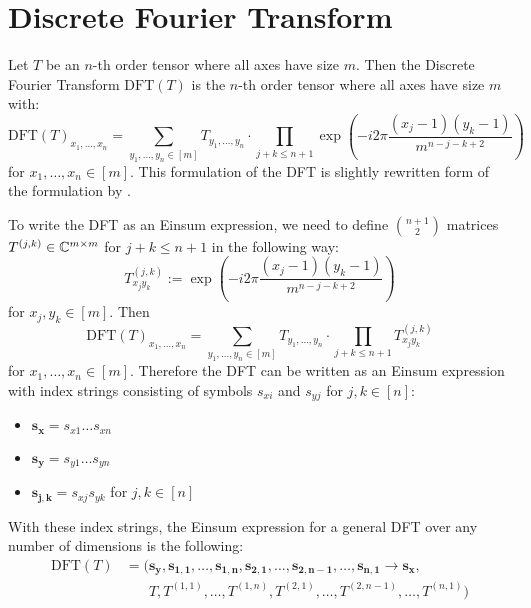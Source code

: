 \section{Discrete Fourier Transform}
Let $T$ be an $n$-th order tensor where all axes have size $m$.
Then the Discrete Fourier Transform $\text{DFT}(T)$ is the $n$-th order tensor where all axes have size $m$ with:
$$\text{DFT}(T)_{x_1,\dots,x_n} = \sum\limits_{y_1,\dots,y_n \in [m]} T_{y_1, \dots, y_n} \cdot \prod\limits_{j + k \leq n + 1} \exp\left(-i2\pi \frac{(x_j - 1) (y_k - 1)}{m^{n - j - k + 2}}\right)$$
for $x_1,\dots,x_n \in [m]$.
This formulation of the DFT is slightly rewritten form of the formulation by \citet{Aji2000}.

To write the DFT as an Einsum expression, we need to define $\binom{n + 1}{2}$ matrices $T^{(j,k)} \in \mathbb{C}^{m \times m}$ for $j + k \leq n + 1$ in the following way:
$$T^{(j,k)}_{x_j y_k} := \exp\left(-i2\pi \frac{(x_j - 1) (y_k - 1)}{m^{n - j - k + 2}}\right)$$
for $x_j, y_k \in [m]$.
Then
$$\text{DFT}(T)_{x_1,\dots,x_n} = \sum\limits_{y_1,\dots,y_n \in [m]} T_{y_1, \dots, y_n} \cdot \prod\limits_{j + k \leq n + 1} T^{(j,k)}_{x_j y_k}$$
for $x_1,\dots,x_n \in [m]$.
Therefore the DFT can be written as an Einsum expression with index strings consisting of symbols $s_{xi}$ and $s_{yj}$ for $j,k \in [n]$:
\begin{itemize}
    \item $\bm{s_x} = s_{x1}\dots s_{x n}$
    \item $\bm{s_y} = s_{y1}\dots s_{y n}$
    \item $\bm{s_{j,k}} = s_{xj} s_{yk}$ for $j,k \in [n]$
\end{itemize}
With these index strings, the Einsum expression for a general DFT over any number of dimensions is the following:
\begin{align*}
    \text{DFT}(T) & = (\bm{s_y}, \bm{s_{1,1}}, \dots, \bm{s_{1,n}}, \bm{s_{2,1}}, \dots, \bm{s_{2,n - 1}}, \dots, \bm{s_{n, 1}} \rightarrow \bm{s_x}, \\
                  & \phantom{{}=(} T, T^{(1,1)}, \dots, T^{(1, n)}, T^{(2,1)}, \dots, T^{(2, n-1)}, \dots, T^{(n, 1)})
\end{align*}

